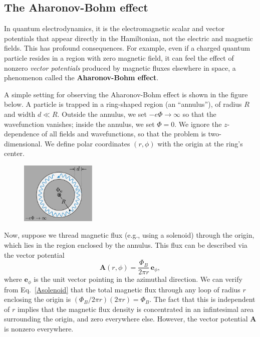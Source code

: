\documentclass[prx,12pt]{revtex4-2}
\begin{document}
\subsection{The Aharonov-Bohm effect}

In quantum electrodynamics, it is the electromagnetic scalar and
vector potentials that appear directly in the Hamiltonian, not the
electric and magnetic fields.  This has profound consequences.  For
example, even if a charged quantum particle resides in a region with
zero magnetic field, it can feel the effect of nonzero \textit{vector
  potentials} produced by magnetic fluxes elsewhere in space, a
phenomenon called the \textbf{Aharonov-Bohm effect}.

A simple setting for observing the Aharonov-Bohm effect is shown in
the figure below.  A particle is trapped in a ring-shaped region (an
``annulus''), of radius $R$ and width $d \ll R$.  Outside the annulus,
we set $-e\Phi\rightarrow\infty$ so that the wavefunction vanishes;
inside the annulus, we set $\Phi = 0$.  We ignore the $z$-dependence
of all fields and wavefunctions, so that the problem is
two-dimensional.  We define polar coordinates $(r,\phi)$ with the
origin at the ring's center.

\begin{figure}[h]
  \centering\includegraphics[width=0.32\textwidth]{annulus}
\end{figure}

Now, suppose we thread magnetic flux (e.g., using a solenoid) through
the origin, which lies in the region enclosed by the annulus.  This
flux can be described via the vector potential
\begin{equation}
  \mathbf{A}(r,\phi) = \frac{\Phi_B}{2\pi r} \, \mathbf{e}_\phi,
  \label{Asolenoid}
\end{equation}
where $\mathbf{e}_\phi$ is the unit vector pointing in the azimuthal
direction.  We can verify from Eq.~\eqref{Asolenoid} that the total
magnetic flux through any loop of radius $r$ enclosing the origin is
$(\Phi_B/2\pi r)(2\pi r) = \Phi_B$.  The fact that this is independent
of $r$ implies that the magnetic flux density is concentrated in an
infintesimal area surrounding the origin, and zero everywhere
else. However, the vector potential $\mathbf{A}$ is nonzero
everywhere.
\end{document}

